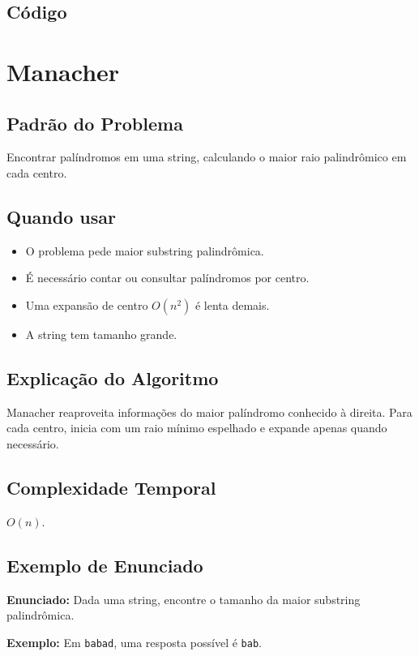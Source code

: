 \subsection{Código}

\section{Manacher}

\subsection{Padrão do Problema}
Encontrar palíndromos em uma string, calculando o maior raio palindrômico em cada centro.

\subsection{Quando usar}
\begin{itemize}[nosep]
  \item O problema pede maior substring palindrômica.
  \item É necessário contar ou consultar palíndromos por centro.
  \item Uma expansão de centro $O(n^2)$ é lenta demais.
  \item A string tem tamanho grande.
\end{itemize}

\subsection{Explicação do Algoritmo}
Manacher reaproveita informações do maior palíndromo conhecido à direita. Para cada centro, inicia com um raio mínimo espelhado e expande apenas quando necessário.

\subsection{Complexidade Temporal}
$O(n)$.

\subsection{Exemplo de Enunciado}
\begin{exemplodiabox}
\textbf{Enunciado:} Dada uma string, encontre o tamanho da maior substring palindrômica.

\textbf{Exemplo:} Em \texttt{babad}, uma resposta possível é \texttt{bab}.
\end{exemplodiabox}

